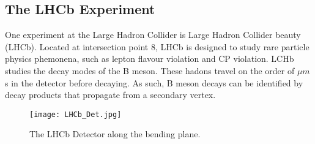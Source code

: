   \subsection{The LHCb Experiment}

    One experiment at the Large Hadron Collider is Large Hadron Collider beauty (LHCb).
    Located at intersection point 8, LHCb is designed to study rare particle physics phemonena, such as lepton flavour violation and CP violation. 
    LCHb studies the decay modes of the B meson.
    These hadons travel on the order of $\mu m$s in the detector before decaying. 
    As such, B meson decays can be identified by decay products that propagate from a secondary vertex.

    \begin{figure}[h!]
      \centering
      \texttt{[image: LHCb\_Det.jpg]}
      \caption{The LHCb Detector along the bending plane.}
      \label{fig:LHCb_Collab}
    \end{figure}

